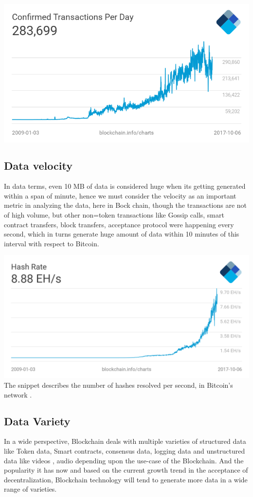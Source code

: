 \documentclass[sigconf]{acmart}
\begin{document}
\includegraphics[scale=0.35]{paper1/images/bitcoin-trans.png}
\subsection{Data velocity}
In data terms, even 10 MB of data is considered huge when its getting generated within a span of minute, hence we must consider the velocity as an important metric in analyzing the data, here in Bock chain, though the transactions are not of high volume, but other non=token transactions like Gossip calls, smart contract transfers, block transfers, acceptance protocol were happening every second, which in turns generate huge amount of data within 10 minutes of this interval with respect to Bitcoin.

\includegraphics[scale=0.2]{paper1/images/hash-rate.png}
The snippet describes the number of hashes resolved per second, in Bitcoin's network \cite{hastratepersec}.

\subsection{Data Variety}
In a wide perspective, Blockchain deals with multiple varieties of structured data like Token data, Smart contracts, consensus data, logging data and unstructured data like videos \cite{livepeer-BC-stream}, audio depending upon the use-case of the Blockchain. And the popularity it has now and based on the current growth trend in the acceptance of decentralization, Blockchain technology will tend to generate more data in a wide range of varieties.
\end{document}

